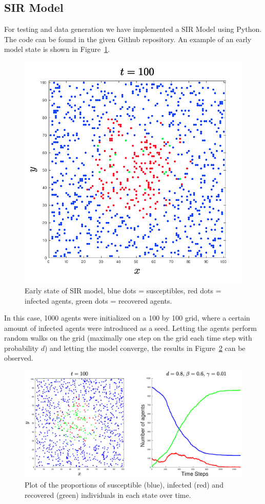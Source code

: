 
\subsection{SIR Model}

For testing and data generation we have implemented a SIR Model using Python. The code can be found in the given Github repository.\newline
An example of an early model state is shown in Figure~\ref{fig:1}.

\begin{figure}[H]
	\centering
	\includegraphics[width=0.4\linewidth]{initial_setup.png}
	\caption{Early state of SIR model, blue dots = susceptibles, red dots = infected agents, green dots = recovered agents.}%
	\label{fig:1}
\end{figure}

In this case, 1000 agents were initialized on a 100 by 100 grid, where a certain amount of infected agents were introduced as a seed. Letting the agents perform random walks on the grid (maximally one step on the grid each time step with probability $d$) and letting the model converge, the results in Figure~\ref{fig:2} can be observed.

\begin{figure}[H]
	\centering
	\includegraphics[width=0.9\linewidth]{1_1000_agents}
	\caption{Plot of the proportions of susceptible (blue), infected (red) and recovered (green) individuals in each state over time.}%
	\label{fig:2}
\end{figure}

